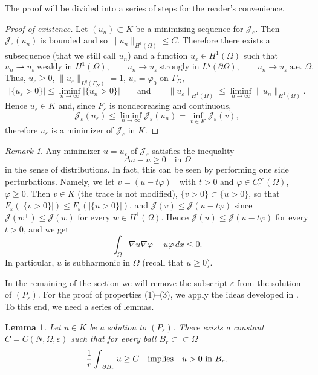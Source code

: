 \documentclass[11pt]{amsart}
\newtheorem{lemma}{Lemma}[section]
\theoremstyle{definition}
\theoremstyle{remark}
\newtheorem{remark}{Remark}[section]
\numberwithin{equation}{section}
\newcommand{\cJ}{\mathcal{J}}
\newcommand{\avint}{\mathop{\,\rlap{--}\!\!\int}\nolimits}
\begin{document}
The proof will be divided into a series of steps for the reader's convenience.

\begin{proof}[Proof of existence]
Let $(u_n)\subset K$ be a minimizing sequence for $\cJ_\varepsilon$. Then $\cJ_\varepsilon(u_n)$ is bounded and so $\|u_n\|_{H^1(\Omega)}\le C$. Therefore there exists a subsequence (that we still call $u_n$) and a function $u_\varepsilon\in H^1(\Omega)$ such that
\[
u_n\rightharpoonup u_\varepsilon\ \text{weakly in } H^1(\Omega),\qquad u_n\to u_\varepsilon\ \text{strongly in } L^q(\partial\Omega),\qquad u_n\to u_\varepsilon\ \text{a.e. } \Omega.
\]
Thus, $u_\varepsilon\ge0$, $\|u_\varepsilon\|_{L^q(\Gamma_N)}=1$, $u_\varepsilon=\varphi_0$ on $\Gamma_D$,
\[
|\{u_\varepsilon>0\}|\le\liminf_{n\to\infty}|\{u_n>0\}|\qquad\text{and}\qquad\|u_\varepsilon\|_{H^1(\Omega)}\le\liminf_{n\to\infty}\|u_n\|_{H^1(\Omega)}.
\]
Hence $u_\varepsilon\in K$ and, since $F_\varepsilon$ is nondecreasing and continuous,
\[
\cJ_\varepsilon(u_\varepsilon)\le\liminf_{n\to\infty}\cJ_\varepsilon(u_n)=\inf_{v\in K}\cJ_\varepsilon(v),
\]
therefore $u_\varepsilon$ is a minimizer of $\cJ_\varepsilon$ in $K$.
\end{proof}

\begin{remark}\label{r.sub}
Any minimizer $u=u_\varepsilon$ of $\cJ_\varepsilon$ satisfies the inequality
\begin{equation}\label{sub}
\Delta u-u\ge0\quad\text{in }\Omega
\end{equation}
in the sense of distributions. In fact, this can be seen by performing one side perturbations. Namely, we let $v=(u-t\varphi)^+$ with $t>0$ and $\varphi\in C^\infty_0(\Omega)$, $\varphi\ge0$. Then $v\in K$ (the trace is not modified), $\{v>0\}\subset\{u>0\}$, so that $F_\varepsilon(|\{v>0\}|)\le F_\varepsilon(|\{u>0\}|)$, and $\cJ(v)\le\cJ(u-t\varphi)$ since $\cJ(w^+)\le\cJ(w)$ for every $w\in H^1(\Omega)$. Hence $\cJ(u)\le\cJ(u-t\varphi)$ for every $t>0$, and we get
\[
\int_\Omega\nabla u\nabla\varphi+u\varphi\,dx\le0.
\]
In particular, $u$ is subharmonic in $\Omega$ (recall that $u\ge0$).
\end{remark}

In the remaining of the section we will remove the subscript $\varepsilon$ from the solution of $(P_\varepsilon)$. For the proof of properties (1)--(3), we apply the ideas developed in \cite{AC}. To this end, we need a series of lemmas.

\begin{lemma}\label{l.lip0}
Let $u\in K$ be a solution to $(P_\varepsilon)$. There exists a constant $C=C(N,\Omega,\varepsilon)$ such that for every ball $B_r\subset\subset\Omega$
\[
\frac1r\avint_{\partial B_r}u\ge C\quad\text{implies}\quad u>0\text{ in }B_r.
\]
\end{lemma}
\end{document}
